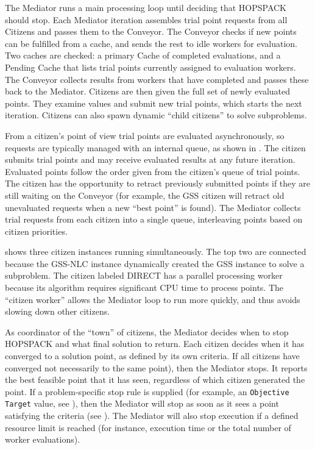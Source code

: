 The Mediator runs a main processing loop until deciding that HOPSPACK should
stop.
Each Mediator iteration assembles trial point requests from all Citizens and
passes them to the Conveyor.  The Conveyor checks if new points can be fulfilled
from a cache, and sends the rest to idle workers for evaluation.  Two caches
are checked: a primary Cache of completed evaluations, and a Pending Cache
that lists trial points currently assigned to evaluation workers.
The Conveyor collects results from workers that have completed and passes
these back to the Mediator.
Citizens are then given the full set of newly evaluated points.  They examine
values and submit new trial points, which starts the
next iteration.  Citizens can also spawn dynamic ``child citizens'' to solve
subproblems.

From a citizen's point of view trial points are evaluated asynchronously,
so requests are typically managed with an internal queue, as shown in
.
The citizen submits trial points and may receive evaluated results at any
future iteration.  Evaluated points follow the order given from the citizen's
queue of trial points.  The citizen has the opportunity to retract previously
submitted points if they are still waiting on the Conveyor (for example,
the GSS citizen will retract old unevaluated requests when a new ``best point''
is found).
The Mediator collects trial requests from each citizen into a single
queue, interleaving points based on citizen priorities.

 shows three citizen instances running
simultaneously.  The top two are connected because the GSS-NLC instance
dynamically created the GSS instance to solve a subproblem.  The citizen
labeled DIRECT has a parallel processing worker because its algorithm requires
significant CPU time to process points.  The ``citizen worker'' allows the
Mediator loop to run more quickly, and thus avoids slowing down other citizens.

As coordinator of the ``town'' of citizens, the Mediator decides when to
stop HOPSPACK and what final solution to return.
Each citizen decides when it has converged to a solution point, as defined by
its own criteria.  If all citizens have converged not necessarily to the same
point), then the Mediator stops.  It reports the best feasible point that it
has seen, regardless of which citizen generated the point.
If a problem-specific stop rule is supplied (for example,
an {\tt Objective Target} value, see ),
then the Mediator will stop as soon as it sees a point satisfying the criteria
(see ).
The Mediator will also stop execution if a defined resource limit is reached
(for instance, execution time or the total number of worker evaluations).

